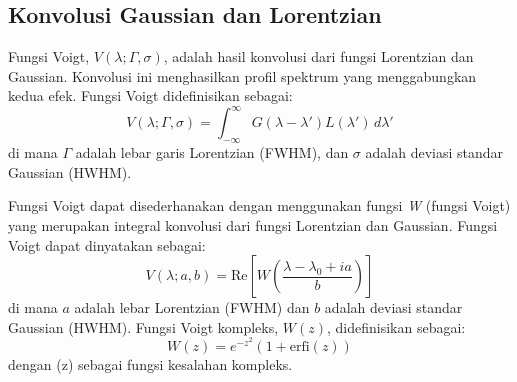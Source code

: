 \subsection{Konvolusi Gaussian dan Lorentzian}
\par Fungsi Voigt, \( V(\lambda; \Gamma, \sigma) \), adalah hasil konvolusi dari fungsi Lorentzian dan Gaussian. Konvolusi ini menghasilkan profil spektrum yang menggabungkan kedua efek. Fungsi Voigt didefinisikan sebagai:
\begin{equation}
V(\lambda; \Gamma, \sigma) = \int_{-\infty}^{\infty} G(\lambda - \lambda') L(\lambda') \, d\lambda'
\end{equation}
di mana \( \Gamma \) adalah lebar garis Lorentzian (FWHM), dan \( \sigma \) adalah deviasi standar Gaussian (HWHM).

\par Fungsi Voigt dapat disederhanakan dengan menggunakan fungsi \textit{W} (fungsi Voigt) yang merupakan integral konvolusi dari fungsi Lorentzian dan Gaussian. Fungsi Voigt dapat dinyatakan sebagai: \cite{Godio2016}
\begin{equation}
V(\lambda; a, b) = \text{Re} \left[ W\left(\frac{\lambda - \lambda_0 + i a}{b}\right) \right]
\end{equation}
di mana \( a \) adalah lebar Lorentzian (FWHM) dan \( b \) adalah deviasi standar Gaussian (HWHM). Fungsi Voigt kompleks, \( W(z) \), didefinisikan sebagai:
\begin{equation}
W(z) = e^{-z^2} \left( 1 + \text{erfi}(z) \right)
\end{equation}
dengan (z) sebagai fungsi kesalahan kompleks.